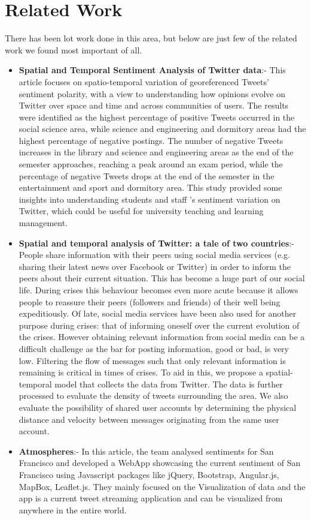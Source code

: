 \documentclass[12pt, oneside]{article}   	%
\begin{document}
\section{Related Work}
There has been lot work done in this area, but below are just few of the related work we found most important of all.
\begin{itemize}
	\item \textbf{Spatial and Temporal Sentiment Analysis of Twitter data}:- This article focuses on spatio-temporal variation of georeferenced Tweets’ sentiment polarity, with a view to understanding how opinions evolve on Twitter over space and time and across communities of users.  The results were identified as the highest percentage of positive Tweets occurred in the social science area, while science and engineering and dormitory areas had the highest percentage of negative postings. The number of negative Tweets increases in the library and science and engineering areas as the end of the semester approaches, reaching a peak around an exam period, while the percentage of negative Tweets drops at the end of the semester in the entertainment and sport and dormitory area. This study provided some insights into understanding students and staff ’s sentiment variation on Twitter, which could be useful for university teaching and learning management.
	\item \textbf{Spatial and temporal analysis of Twitter: a tale of two countries}:- People share information with their peers using social media services (e.g. sharing their latest news over Facebook or Twitter) in order to inform the peers about their current situation. This has become a huge part of our social life. During crises this behaviour becomes even more acute because it allows people to reassure their peers (followers and friends) of their well being expeditiously. Of late, social media services have been also used for another purpose during crises: that of informing oneself over the current evolution of the crises. However obtaining relevant information from social media can be a difficult challenge as the bar for posting information, good or bad, is very low. Filtering the flow of messages such that only relevant information is remaining is critical in times of crises. To aid in this, we propose a spatial-temporal model that collects the data from Twitter. The data is further processed to evaluate the density of tweets surrounding the area. We also evaluate the possibility of shared user accounts by determining the physical distance and velocity between messages originating from the same user account.
	\item \textbf{Atmospheres}:- In this article, the team analysed sentiments for San Francisco and developed a WebApp showcasing the current sentiment of San Francisco using Javascript packages like jQuery, Bootstrap, Angular.js, MapBox, Leaflet.js. They mainly focused on the Visualization of data and the app is a current tweet streaming application and can be visualized from anywhere in the entire world.
	

\end{itemize}
\end{document}

